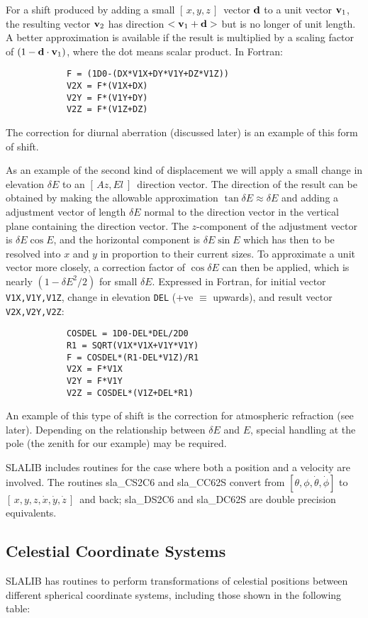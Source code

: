 \documentclass[11pt,twoside]{article}
\newcommand{\azel}      {$[\,Az,El~]$}
\newcommand{\xyz}       {$[\,x,y,z\,]$}
\newcommand{\xyzxyzd}   {$[\,x,y,z,\dot{x},\dot{y},\dot{z}\,]$}
\begin{document}
For a shift produced by adding a small \xyz\ vector ${\bf d}$ to a
unit vector ${\bf v}_1$, the resulting vector ${\bf v}_2$ has direction
$<{\bf v}_1+{\bf d}>$ but is no longer of unit length.  A better approximation
is available if the result is multiplied by a scaling factor of
$(1-{\bf d}\cdot{\bf v}_1)$, where the dot
means scalar product.  In Fortran:
\goodbreak
\begin{verbatim}
            F = (1D0-(DX*V1X+DY*V1Y+DZ*V1Z))
            V2X = F*(V1X+DX)
            V2Y = F*(V1Y+DY)
            V2Z = F*(V1Z+DZ)
\end{verbatim}
\goodbreak
\noindent
The correction for diurnal aberration (discussed later) is
an example of this form of shift.

As an example of the second kind of displacement
we will apply a small change in elevation $\delta E$ to an
\azel\ direction vector.  The direction of the
result can be obtained by making the allowable approximation
${\tan \delta E\approx\delta E}$ and adding a adjustment
vector of length $\delta E$ normal
to the direction vector in the vertical plane containing the direction
vector.  The $z$-component of the adjustment vector is
$\delta E \cos E$,
and the horizontal component is
$\delta E \sin E$ which has then to be
resolved into $x$ and $y$ in proportion to their current sizes. To
approximate a unit vector more closely, a correction factor of
$\cos \delta E$ can then be applied, which is nearly
$(1-\delta E^2 /2)$ for
small $\delta E$.  Expressed in Fortran, for initial vector
{\tt V1X,V1Y,V1Z}, change in elevation {\tt DEL}
(+ve $\equiv$ upwards), and result
vector {\tt V2X,V2Y,V2Z}:
\goodbreak
\begin{verbatim}
            COSDEL = 1D0-DEL*DEL/2D0
            R1 = SQRT(V1X*V1X+V1Y*V1Y)
            F = COSDEL*(R1-DEL*V1Z)/R1
            V2X = F*V1X
            V2Y = F*V1Y
            V2Z = COSDEL*(V1Z+DEL*R1)
\end{verbatim}
\goodbreak
An example of this type of shift is the correction for atmospheric
refraction (see later).
Depending on the relationship between $\delta E$ and $E$, special
handling at the pole (the zenith for our example) may be required.

SLALIB includes routines for the case where both a position
and a velocity are involved.  The routines
sla\_CS2C6
and
sla\_CC62S
convert from $[\theta,\phi,\dot{\theta},\dot{\phi}]$
to \xyzxyzd\ and back;
sla\_DS2C6
and
sla\_DC62S
are double precision equivalents.

\subsection {Celestial Coordinate Systems}
SLALIB has routines to perform transformations
of celestial positions between different spherical
coordinate systems, including those shown in the following table:
\end{document}
